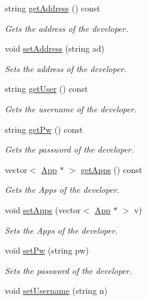 \begin{DoxyCompactItemize}
string \hyperlink{class_developer_ab4e0bd9ec4a725ea0074686f624a4dd5}{get\-Address} () const 
\begin{DoxyCompactList}\small\item\em Gets the address of the developer. \end{DoxyCompactList}\item 
void \hyperlink{class_developer_a9c360469be382413d32f4e08b9123bb9}{set\-Address} (string ad)
\begin{DoxyCompactList}\small\item\em Sets the address of the developer. \end{DoxyCompactList}\item 
string \hyperlink{class_developer_a81bc87b5c918165049dcf71f3e4cd883}{get\-User} () const 
\begin{DoxyCompactList}\small\item\em Gets the username of the developer. \end{DoxyCompactList}\item 
string \hyperlink{class_developer_a1b66c4f606291cc4f4d7a5a6aa1c737b}{get\-Pw} () const 
\begin{DoxyCompactList}\small\item\em Gets the password of the developer. \end{DoxyCompactList}\item 
vector$<$ \hyperlink{class_app}{App} $\ast$ $>$ \hyperlink{class_developer_a9a9569dd9320e5a5637ccd3bc870acec}{get\-Apps} () const 
\begin{DoxyCompactList}\small\item\em Gets the Apps of the developer. \end{DoxyCompactList}\item 
void \hyperlink{class_developer_ac2d1dd070fc88aae2e5e86e0be192615}{set\-Apps} (vector$<$ \hyperlink{class_app}{App} $\ast$ $>$ v)
\begin{DoxyCompactList}\small\item\em Sets the Apps of the developer. \end{DoxyCompactList}\item 
void \hyperlink{class_developer_ab121efa005a8a7b878408ad65a269dd6}{set\-Pw} (string pw)
\begin{DoxyCompactList}\small\item\em Sets the password of the developer. \end{DoxyCompactList}\item 
void \hyperlink{class_developer_a41a32e1735afeb1422090fd11f8dd5dd}{set\-Username} (string n)

\end{DoxyCompactItemize}
